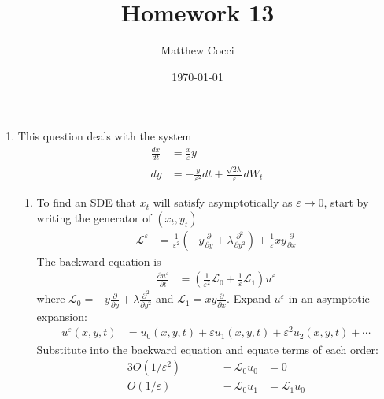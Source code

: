 \documentclass[12pt]{article}
\author{Matthew Cocci}
\title{Homework 13}
\date{\today}
\theoremstyle{plain}
\theoremstyle{definition}
\theoremstyle{remark}
\begin{document}
\maketitle



\begin{enumerate}
  \item %
    This question deals with the system
    \begin{align*}
      \frac{dx}{dt} &= \frac{x}{\varepsilon}y\\
      dy &= -\frac{y}{\varepsilon^2} dt + \frac{\sqrt{2\lambda}}{\varepsilon} dW_t
    \end{align*}
    \begin{enumerate}
      \item %
        To find an SDE that $x_t$ will satisfy asymptotically as
        $\varepsilon\rightarrow 0$, start by writing the generator of
        $(x_t,y_t)$
        \begin{align*}
          \mathscr{L}^\varepsilon
          &=
          \frac{1}{\varepsilon^2}
          \left(
          -y\frac{\partial}{\partial y}
          + \lambda\frac{\partial^2}{\partial y^2}
          \right)
          +
          \frac{1}{\varepsilon}
          xy \frac{\partial}{\partial x}
        \end{align*}
        The backward equation is
        \begin{align*}
          \frac{\partial u^\varepsilon}{\partial t}
          &= \left(
          \frac{1}{\varepsilon^2} \mathscr{L}_0
          + \frac{1}{\varepsilon} \mathscr{L}_1
          \right)
          u^\varepsilon
        \end{align*}
        where $\mathscr{L}_0= -y\frac{\partial}{\partial y} +
        \lambda\frac{\partial^2}{\partial y^2}$
        and $\mathscr{L}_1= xy \frac{\partial}{\partial x}$.
        Expand $u^\varepsilon$ in an asymptotic expansion:
        \begin{align*}
          u^\varepsilon(x,y,t)
          &=
          u_0(x,y,t)
          + \varepsilon u_1(x,y,t)
          + \varepsilon^2 u_2(x,y,t) + \cdots
        \end{align*}
        Substitute into the backward equation and equate terms of each
        order:
        \begin{alignat*}{3}
          O(1/\varepsilon^2)&&\qquad -\mathscr{L}_0u_0 &= 0 \\
          O(1/\varepsilon) && \qquad -\mathscr{L}_0u_1 &= \mathscr{L}_1u_0 \\

\end{alignat*}
\end{enumerate}
\end{enumerate}
\end{document}
